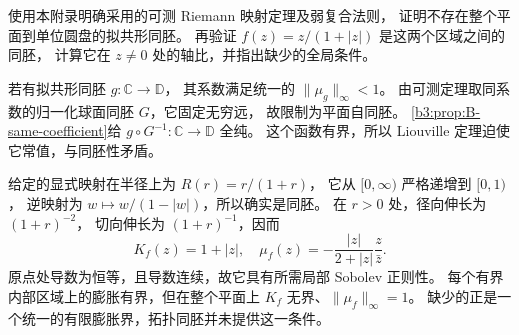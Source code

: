\begin{exercise}\label{b3:ex:B-8}
使用本附录明确采用的可测 Riemann 映射定理及弱复合法则，
证明不存在整个平面到单位圆盘的拟共形同胚。
再验证 \(f(z)=z/(1+|z|)\) 是这两个区域之间的同胚，
计算它在 \(z\ne0\) 处的轴比，并指出缺少的全局条件。
\end{exercise}
\begin{solution}
若有拟共形同胚 \(g:\mathbb C\rightarrow\mathbb D\)，
其系数满足统一的 \(\|\mu_g\|_\infty<1\)。
由可测定理取同系数的归一化球面同胚 \(G\)，它固定无穷远，
故限制为平面自同胚。
\cref{b3:prop:B-same-coefficient}给
\(g\circ G^{-1}:\mathbb C\rightarrow\mathbb D\) 全纯。
这个函数有界，所以 Liouville 定理迫使它常值，与同胚性矛盾。

给定的显式映射在半径上为 \(R(r)=r/(1+r)\)，
它从 \([0,\infty)\) 严格递增到 \([0,1)\)，
逆映射为 \(w\mapsto w/(1-|w|)\)，所以确实是同胚。
在 \(r>0\) 处，径向伸长为 \((1+r)^{-2}\)，
切向伸长为 \((1+r)^{-1}\)，因而
\[
 K_f(z)=1+|z|,\quad
 \mu_f(z)=-\frac{|z|}{2+|z|}\frac z{\bar z}.
\]
原点处导数为恒等，且导数连续，故它具有所需局部 Sobolev 正则性。
每个有界内部区域上的膨胀有界，但在整个平面上
\(K_f\) 无界、\(\|\mu_f\|_\infty=1\)。
缺少的正是一个统一的有限膨胀界，拓扑同胚并未提供这一条件。
\end{solution}
